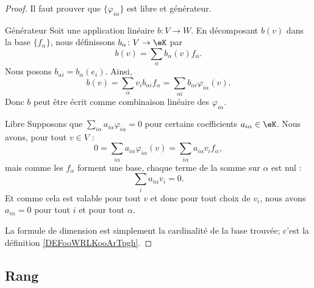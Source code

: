 \begin{proof}
    Il faut prouver que \( \{\varphi_{i\alpha}\}\) est libre et générateur.

    \begin{subproof}
        \item[Générateur]
            Soit une application linéaire \( b\colon V\to W\). En décomposant \( b(v)\) dans la base \( \{f_{\alpha}\}\), nous définissons \( b_{\alpha}\colon V\to \eK\) par
            \begin{equation}
                b(v)=\sum_{\alpha}b_{\alpha}(v)f_{\alpha}.
            \end{equation}
            Nous posons \( b_{\alpha i}=b_{\alpha}(e_i)\). Ainsi,
            \begin{equation}
                b(v)=\sum_{\alpha}v_ib_{\alpha i}f_{\alpha}=\sum_{\alpha i}b_{\alpha i}\varphi_{i\alpha}(v).
            \end{equation}
            Donc \( b\) peut être écrit comme combinaison linéaire des \( \varphi_{i\alpha}\).

        \item[Libre]
            Supposons que \( \sum_{i\alpha}a_{i\alpha}\varphi_{i\alpha}=0\) pour certains coefficients \( a_{i\alpha}\in \eK\). Nous avons, pour tout \( v\in V\) :
            \begin{equation}
                0=\sum_{i\alpha}a_{i\alpha}\varphi_{i\alpha}(v)=\sum_{i\alpha}a_{i\alpha}v_if_{\alpha},
            \end{equation}
            mais comme les \( f_{\alpha}\) forment une base, chaque terme de la somme sur \( \alpha\) est nul :
            \begin{equation}
                \sum_ia_{i\alpha}v_i=0.
            \end{equation}
            Et comme cela est valable pour tout \( v\) et donc pour tout choix de \( v_i\), nous avons \( a_{i\alpha}=0\) pour tout \( i\) et pour tout \( \alpha\).
    \end{subproof}
    La formule de dimension est simplement la cardinalité de la base trouvée; c'est la définition \ref{DEFooWRLKooArTpgh}.
\end{proof}

\subsection{Rang}

